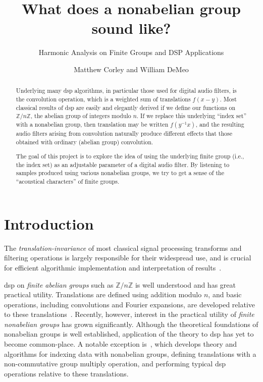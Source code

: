 \documentclass[reqno,onecolumn,oneside]{paper}
\title{What does a nonabelian group sound like?}
\subtitle{Harmonic Analysis on Finite Groups and DSP Applications}
\author{Matthew Corley and William DeMeo}
\newcommand{\<}{\ensuremath{\langle}}
\renewcommand{\>}{\ensuremath{\rangle}}
\newcommand{\field}[1]{\ensuremath{\mathbb{#1}}}
\newcommand{\Z}{\field{Z}}                   %
\begin{document}
\maketitle

\begin{abstract}
Underlying many \ac{dsp} algorithms, in particular those used for digital audio
filters, is the convolution operation, which is a weighted sum of translations
$f(x-y)$. Most classical results of \ac{dsp} are easily and elegantly derived if
we define our functions on $\Z/n\Z$, the abelian group of integers modulo $n$. 
If we replace this underlying ``index set'' with a nonabelian group, then
translation may be written $f(y^{-1}x)$, and the resulting audio filters arising
from convolution naturally produce different effects that those obtained with
ordinary (abelian group) convolution. 

The goal of this project is to explore the idea of using the underlying finite
group (i.e., the index set) as an adjustable parameter of a digital audio
filter. By listening to samples produced using various nonabelian groups, we try
to get a sense of the ``acoustical characters'' of finite groups.
\end{abstract}


\section{Introduction}
The \emph{translation-invariance} of most classical signal
processing transforms and filtering operations is largely
responsible for their widespread use, and is crucial for
efficient algorithmic implementation and interpretation 
of results~\cite{An:2003}. 

\ac{dsp} on \emph{finite abelian groups} such as $\Z/n\Z$ is
well understood and has great practical utility.  
Translations are defined using addition modulo $n$, and 
basic operations, including convolutions and Fourier 
expansions, are developed relative to these translations~\cite{Tolimieri:1998}. 
Recently, however, interest in the practical utility of
\emph{finite nonabelian groups} has grown
significantly. Although the theoretical foundations of
nonabelian groups is well established, application of the
theory to \ac{dsp} has yet to  become common-place.
A notable exception is~\cite{An:2003},
which develops theory and algorithms for
indexing data with nonabelian groups, defining translations
with a non-commutative group multiply operation, and
performing typical \ac{dsp} operations relative to these
translations. 
\end{document}
